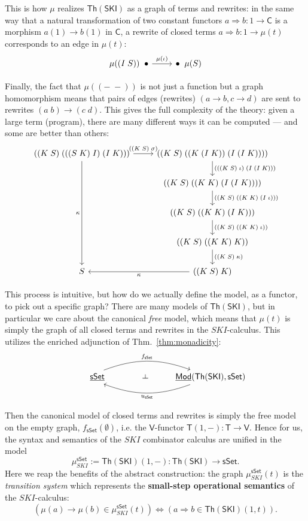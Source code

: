 \documentclass{amsart}
\theoremstyle{definition}
\def\ld{\rotatebox[origin=c]{-90}{$\dashv$}} %
\newcommand{\sSet}{\mathsf{sSet}}
\newcommand{\Th}{\mathsf{Th}}
\newcommand{\Mod}{\mathsf{Mod}}
\newcommand{\V}{\mathsf{V}}
\newcommand{\C}{\mathsf{C}}
\newcommand{\T}{\mathsf{T}}
\newcommand{\maps}{\colon}
\begin{document}
This is how $\mu$ realizes $\Th(\mathsf{SKI})$ as a graph of terms and rewrites: in the same way that a natural transformation of two constant functors $a\Rightarrow b\maps 1\to \C$ is a morphism $a(1)\to b(1)$ in $\C$, a rewrite of closed terms $a\Rightarrow b\maps 1\to \mu(t)$ corresponds to an edge in $\mu(t)$:
\[\begin{tikzcd}
	\mu((I\; S)) \;\; \bullet \arrow[r,"\mu(\iota)"] & \bullet \;\; \mu(S)
\end{tikzcd}\]

Finally, the fact that $\mu((-\;-))$ is not just a function but a graph homomorphism means that pairs of edges (rewrites) $(a\to b, c\to d)$ are sent to rewrites $(a\; b) \to (c\; d)$. This gives the full complexity of the theory: given a large term (program), there are many different ways it can be computed --- and some are better than others:
\[\begin{tikzcd}
	((K\; S)\; (((S\; K)\; I)\; (I\; K))) \arrow[r,"((K\; S)\; \sigma)"] \arrow[dddd,swap,"\kappa"] & ((K\; S)\; ((K\;(I\; K))\; (I\; (I\; K)))) \arrow[d,"(((K\; S)\; \iota)\; (I\; (I\; K)))"]\\
	& ((K\; S)\; ((K\; K)\; (I\; (I\; K)))) \arrow[d,"((K\; S)\; ((K\; K)\; (I\; \iota)))"]\\
	& ((K\; S)\; ((K\; K)\; (I\; K))) \arrow[d,"((K\; S)\; ((K\; K)\; \iota))"]\\
	& ((K\; S)\; ((K\; K)\; K)) \arrow[d,"((K\; S)\; \kappa)"]\\
	S & ((K\; S)\; K)\arrow[l,"\kappa"]
\end{tikzcd}\]

This process is intuitive, but how do we actually define the model, as a functor, to pick out a specific graph? There are many models of $\Th(\mathsf{SKI})$, but in particular we care about the canonical \textit{free} model, which means that $\mu(t)$ is simply the graph of all closed terms and rewrites in the $SKI$-calculus. This utilizes the enriched adjunction of Thm.\ \ref{thm:monadicity}:
\[\begin{tikzcd}
\phantom{AAAA} \underline{\sSet} \arrow[bend left=20,"f_\sSet"]{rr}
& {\phantom{Aa} \ld} &
\arrow[bend left=20,"u_\sSet"]{ll} \underline{\Mod}(\Th(\mathsf{SKI}),\sSet)
\end{tikzcd}\]

Then the canonical model of closed terms and rewrites is simply the free model on the empty graph, $f_\sSet(\emptyset)$, i.e. the $\V$-functor $\T(1,-)\maps\T\to \V$. Hence for us, the syntax and semantics of the $SKI$ combinator calculus are unified in the model $$\mu_{SKI}^\sSet:= \Th(\mathsf{SKI})(1,-)\maps \Th(\mathsf{SKI}) \to \sSet.$$ Here we reap the benefits of the abstract construction: the graph $\mu_{SKI}^\sSet(t)$ is the \textit{transition system} which represents the \textbf{small-step operational semantics} of the $SKI$-calculus: $$(\mu(a) \to \mu(b) \in \mu_{SKI}^\sSet(t)) \iff (a \Rightarrow b \in \Th(\mathsf{SKI})(1,t)).$$
\end{document}
